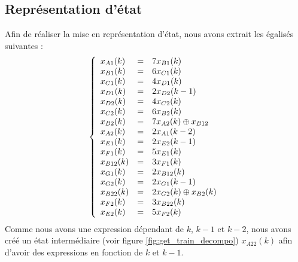 \subsection{Représentation d'état}
Afin de réaliser la mise en représentation d'état, nous avons extrait les égalisés suivantes :
\begin{equation}
\label{equ:ee1}
\left\lbrace
\begin{array}{l c l}
x_{A1}(k) &=&	7x_{B1}(k)\\ 
x_{B1}(k) &=&	6x_{C1}(k)\\
x_{C1}(k) &=& 	4x_{D1}(k)\\
x_{D1}(k) &=&	2x_{D2}(k-1)\\
x_{D2}(k) &=&	4x_{C2}(k)\\
x_{C2}(k) &=&	6x_{B2}(k)\\
x_{B2}(k) &=&	7x_{A2}(k) \oplus x_{B12}\\
x_{A2}(k) &=&	2x_{A1}(k-2)\\
x_{E1}(k) &=&	2x_{E2}(k-1)\\
x_{F1}(k) &=&	5x_{E1}(k)\\
x_{B12}(k) &=&	3x_{F1}(k)\\
x_{G1}(k) &=&	2x_{B12}(k)\\
x_{G2}(k) &=&	2x_{G1}(k-1)\\
x_{B22}(k) &=&	2x_{G2}(k) \oplus x_{B2}(k)\\
x_{F2}(k) &=&	3x_{B22}(k)\\
x_{E2}(k) &=&	5x_{F2}(k)   \\  
\end{array}
\right. 
\end{equation}
Comme nous avons une expression dépendant de $k$, $k-1$ et $k-2$, nous avons créé un état intermédiaire (voir figure \ref{fig:get_train_decompo}) $x_{A22}(k)$ afin d'avoir des expressions en fonction de $k$ et $k-1$.
